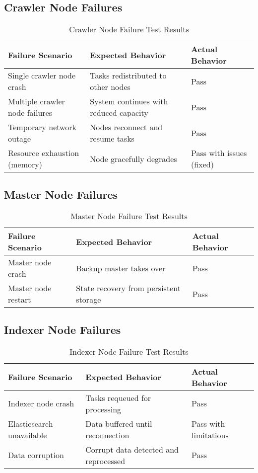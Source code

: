 \documentclass[12pt,a4paper]{report}
\begin{document}
\subsection{Crawler Node Failures}
\begin{table}[H]
    \centering
    \begin{tabularx}{\textwidth}{|X|X|X|}
        \hline
        \textbf{Failure Scenario} & \textbf{Expected Behavior} & \textbf{Actual Behavior} \\
        \hline
        Single crawler node crash & Tasks redistributed to other nodes & Pass \\
        \hline
        Multiple crawler node failures & System continues with reduced capacity & Pass \\
        \hline
        Temporary network outage & Nodes reconnect and resume tasks & Pass \\
        \hline
        Resource exhaustion (memory) & Node gracefully degrades & Pass with issues (fixed) \\
        \hline
    \end{tabularx}
    \caption{Crawler Node Failure Test Results}
\end{table}

\subsection{Master Node Failures}
\begin{table}[H]
    \centering
    \begin{tabularx}{\textwidth}{|X|X|X|}
        \hline
        \textbf{Failure Scenario} & \textbf{Expected Behavior} & \textbf{Actual Behavior} \\
        \hline
        Master node crash & Backup master takes over & Pass \\
        \hline
        Master node restart & State recovery from persistent storage & Pass \\
        \hline
    \end{tabularx}
    \caption{Master Node Failure Test Results}
\end{table}

\subsection{Indexer Node Failures}
\begin{table}[H]
    \centering
    \begin{tabularx}{\textwidth}{|X|X|X|}
        \hline
        \textbf{Failure Scenario} & \textbf{Expected Behavior} & \textbf{Actual Behavior} \\
        \hline
        Indexer node crash & Tasks requeued for processing & Pass \\
        \hline
        Elasticsearch unavailable & Data buffered until reconnection & Pass with limitations \\
        \hline
        Data corruption & Corrupt data detected and reprocessed & Pass \\
        \hline
    \end{tabularx}
    \caption{Indexer Node Failure Test Results}
\end{table}
\end{document}
